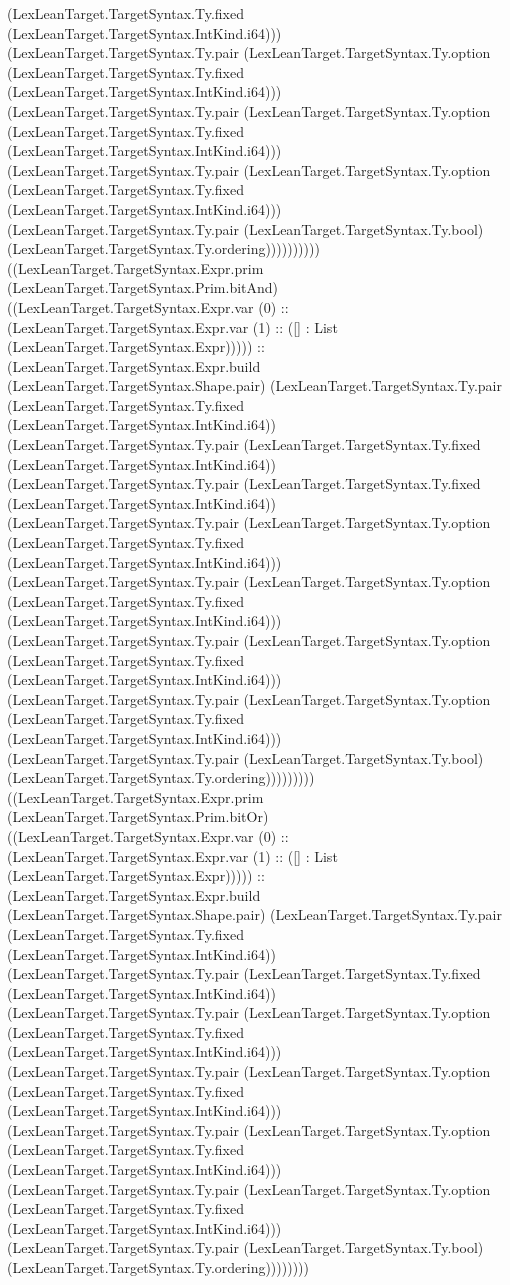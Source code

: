 \documentclass[11pt]{article}
\begin{document}
(LexLeanTarget.TargetSyntax.Ty.fixed (LexLeanTarget.TargetSyntax.IntKind.i64))) (LexLeanTarget.TargetSyntax.Ty.pair (LexLeanTarget.TargetSyntax.Ty.option (LexLeanTarget.TargetSyntax.Ty.fixed (LexLeanTarget.TargetSyntax.IntKind.i64))) (LexLeanTarget.TargetSyntax.Ty.pair (LexLeanTarget.TargetSyntax.Ty.option (LexLeanTarget.TargetSyntax.Ty.fixed (LexLeanTarget.TargetSyntax.IntKind.i64))) (LexLeanTarget.TargetSyntax.Ty.pair (LexLeanTarget.TargetSyntax.Ty.option (LexLeanTarget.TargetSyntax.Ty.fixed (LexLeanTarget.TargetSyntax.IntKind.i64))) (LexLeanTarget.TargetSyntax.Ty.pair (LexLeanTarget.TargetSyntax.Ty.bool) (LexLeanTarget.TargetSyntax.Ty.ordering)))))))))) ((LexLeanTarget.TargetSyntax.Expr.prim (LexLeanTarget.TargetSyntax.Prim.bitAnd) ((LexLeanTarget.TargetSyntax.Expr.var (0) :: (LexLeanTarget.TargetSyntax.Expr.var (1) :: ([] : List (LexLeanTarget.TargetSyntax.Expr))))) :: (LexLeanTarget.TargetSyntax.Expr.build (LexLeanTarget.TargetSyntax.Shape.pair) (LexLeanTarget.TargetSyntax.Ty.pair (LexLeanTarget.TargetSyntax.Ty.fixed (LexLeanTarget.TargetSyntax.IntKind.i64)) (LexLeanTarget.TargetSyntax.Ty.pair (LexLeanTarget.TargetSyntax.Ty.fixed (LexLeanTarget.TargetSyntax.IntKind.i64)) (LexLeanTarget.TargetSyntax.Ty.pair (LexLeanTarget.TargetSyntax.Ty.fixed (LexLeanTarget.TargetSyntax.IntKind.i64)) (LexLeanTarget.TargetSyntax.Ty.pair (LexLeanTarget.TargetSyntax.Ty.option (LexLeanTarget.TargetSyntax.Ty.fixed (LexLeanTarget.TargetSyntax.IntKind.i64))) (LexLeanTarget.TargetSyntax.Ty.pair (LexLeanTarget.TargetSyntax.Ty.option (LexLeanTarget.TargetSyntax.Ty.fixed (LexLeanTarget.TargetSyntax.IntKind.i64))) (LexLeanTarget.TargetSyntax.Ty.pair (LexLeanTarget.TargetSyntax.Ty.option (LexLeanTarget.TargetSyntax.Ty.fixed (LexLeanTarget.TargetSyntax.IntKind.i64))) (LexLeanTarget.TargetSyntax.Ty.pair (LexLeanTarget.TargetSyntax.Ty.option (LexLeanTarget.TargetSyntax.Ty.fixed (LexLeanTarget.TargetSyntax.IntKind.i64))) (LexLeanTarget.TargetSyntax.Ty.pair (LexLeanTarget.TargetSyntax.Ty.bool) (LexLeanTarget.TargetSyntax.Ty.ordering))))))))) ((LexLeanTarget.TargetSyntax.Expr.prim (LexLeanTarget.TargetSyntax.Prim.bitOr) ((LexLeanTarget.TargetSyntax.Expr.var (0) :: (LexLeanTarget.TargetSyntax.Expr.var (1) :: ([] : List (LexLeanTarget.TargetSyntax.Expr))))) :: (LexLeanTarget.TargetSyntax.Expr.build (LexLeanTarget.TargetSyntax.Shape.pair) (LexLeanTarget.TargetSyntax.Ty.pair (LexLeanTarget.TargetSyntax.Ty.fixed (LexLeanTarget.TargetSyntax.IntKind.i64)) (LexLeanTarget.TargetSyntax.Ty.pair (LexLeanTarget.TargetSyntax.Ty.fixed (LexLeanTarget.TargetSyntax.IntKind.i64)) (LexLeanTarget.TargetSyntax.Ty.pair (LexLeanTarget.TargetSyntax.Ty.option (LexLeanTarget.TargetSyntax.Ty.fixed (LexLeanTarget.TargetSyntax.IntKind.i64))) (LexLeanTarget.TargetSyntax.Ty.pair (LexLeanTarget.TargetSyntax.Ty.option (LexLeanTarget.TargetSyntax.Ty.fixed (LexLeanTarget.TargetSyntax.IntKind.i64))) (LexLeanTarget.TargetSyntax.Ty.pair (LexLeanTarget.TargetSyntax.Ty.option (LexLeanTarget.TargetSyntax.Ty.fixed (LexLeanTarget.TargetSyntax.IntKind.i64))) (LexLeanTarget.TargetSyntax.Ty.pair (LexLeanTarget.TargetSyntax.Ty.option (LexLeanTarget.TargetSyntax.Ty.fixed (LexLeanTarget.TargetSyntax.IntKind.i64))) (LexLeanTarget.TargetSyntax.Ty.pair (LexLeanTarget.TargetSyntax.Ty.bool) (LexLeanTarget.TargetSyntax.Ty.ordering)))))))) 
\end{document}
